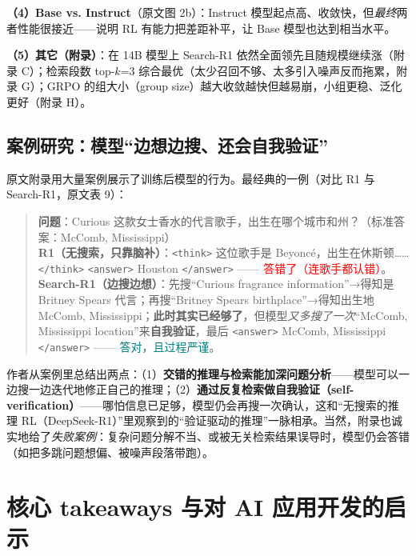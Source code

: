 \documentclass[11pt,UTF8,fontset=fandol]{ctexart}
\newcommand{\tg}[1]{\texttt{<#1>}}
\begin{document}
\textbf{（4）Base vs. Instruct}（原文图 2b）：Instruct 模型起点高、收敛快，但\emph{最终}两者性能很接近——说明 RL 有能力把差距补平，让 Base 模型也达到相当水平。

\textbf{（5）其它（附录）}：在 14B 模型上 Search-R1 依然全面领先且随规模继续涨（附录 C）；检索段数 top-$k$=3 综合最优（太少召回不够、太多引入噪声反而拖累，附录 G）；GRPO 的组大小（group size）越大收敛越快但越易崩，小组更稳、泛化更好（附录 H）。

\subsection{案例研究：模型“边想边搜、还会自我验证”}

原文附录用大量案例展示了训练后模型的行为。最经典的一例（对比 R1 与 Search-R1，原文表 9）：

\begin{quote}\small
\textbf{问题}：Curious 这款女士香水的代言歌手，出生在哪个城市和州？（标准答案：McComb, Mississippi）\\[0.3em]
\textbf{R1（无搜索，只靠脑补）}：\tg{think} 这位歌手是 Beyoncé，出生在休斯顿……\tg{/think} \tg{answer} Houston \tg{/answer} —— \textcolor{red}{答错了（连歌手都认错）}。\\[0.3em]
\textbf{Search-R1（边搜边想）}：先搜“Curious fragrance information”→得知是 Britney Spears 代言；再搜“Britney Spears birthplace”→得知出生地 McComb, Mississippi；\textbf{此时其实已经够了}，但模型\emph{又多搜了一次}“McComb, Mississippi location”来\textbf{自我验证}，最后 \tg{answer} McComb, Mississippi \tg{/answer} —— \textcolor{teal}{答对，且过程严谨}。
\end{quote}

作者从案例里总结出两点：（1）\textbf{交错的推理与检索能加深问题分析}——模型可以一边搜一边迭代地修正自己的推理；（2）\textbf{通过反复检索做自我验证（self-verification）}——哪怕信息已足够，模型仍会再搜一次确认，这和“无搜索的推理 RL（DeepSeek-R1）”里观察到的“验证驱动的推理”一脉相承。当然，附录也诚实地给了\emph{失败案例}：复杂问题分解不当、或被无关检索结果误导时，模型仍会答错（如把多跳问题想偏、被噪声段落带跑）。

\section{核心 takeaways 与对 AI 应用开发的启示}
\end{document}
